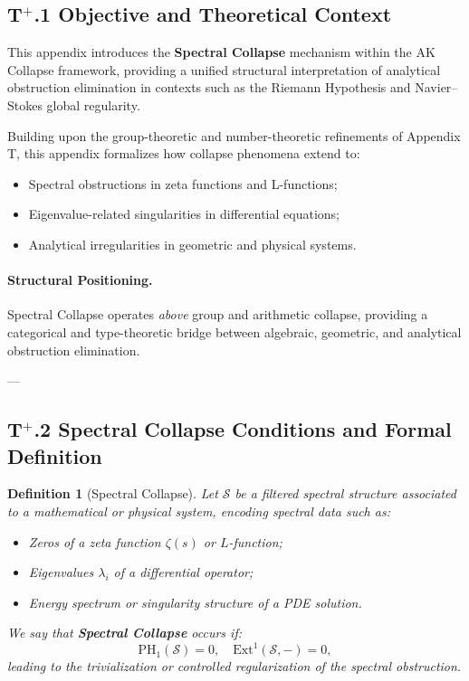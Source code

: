 \documentclass[11pt]{article}
\newtheorem{definition}[theorem]{Definition}
\begin{document}
\subsection*{T$^{+}$.1 Objective and Theoretical Context}

This appendix introduces the \textbf{Spectral Collapse} mechanism within the AK Collapse framework, providing a unified structural interpretation of analytical obstruction elimination in contexts such as the Riemann Hypothesis and Navier--Stokes global regularity.

Building upon the group-theoretic and number-theoretic refinements of Appendix T, this appendix formalizes how collapse phenomena extend to:

\begin{itemize}
    \item Spectral obstructions in zeta functions and L-functions;
    \item Eigenvalue-related singularities in differential equations;
    \item Analytical irregularities in geometric and physical systems.
\end{itemize}

\paragraph{Structural Positioning.} Spectral Collapse operates \emph{above} group and arithmetic collapse, providing a categorical and type-theoretic bridge between algebraic, geometric, and analytical obstruction elimination.

---

\subsection*{T$^{+}$.2 Spectral Collapse Conditions and Formal Definition}

\begin{definition}[Spectral Collapse]
Let $\mathcal{S}$ be a filtered spectral structure associated to a mathematical or physical system, encoding spectral data such as:
\begin{itemize}
    \item Zeros of a zeta function $\zeta(s)$ or $L$-function;
    \item Eigenvalues $\lambda_i$ of a differential operator;
    \item Energy spectrum or singularity structure of a PDE solution.
\end{itemize}

We say that \textbf{Spectral Collapse} occurs if:
\[
\mathrm{PH}_1(\mathcal{S}) = 0, \quad \mathrm{Ext}^1(\mathcal{S}, -) = 0,
\]
leading to the trivialization or controlled regularization of the spectral obstruction.
\end{definition}
\end{document}
